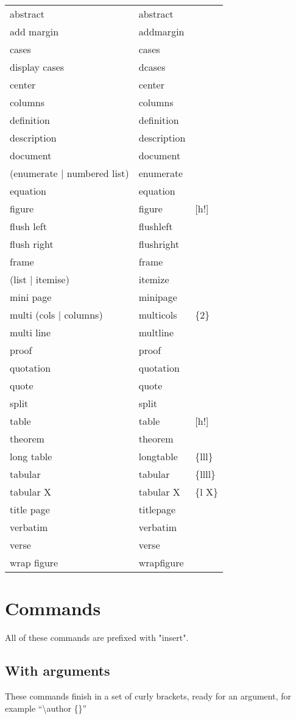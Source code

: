 \documentclass[12pt, a4paper]{article}
\begin{document}
\begin{longtable}{lll}
abstract & abstract & \\
add margin & addmargin & \\
cases & cases & \\
display cases & dcases \\
center & center & \\
columns & columns & \\
definition & definition & \\
description & description & \\
document & document & \\
(enumerate | numbered list) & enumerate & \\
equation & equation & \\
figure & figure & [h!] \\
flush left & flushleft & \\
flush right & flushright & \\
frame & frame & \\
(list | itemise) & itemize & \\
mini page & minipage & \\
multi (cols | columns) & multicols & \{2\} \\
multi line & multline & \\
proof & proof & \\
quotation & quotation & \\
quote & quote & \\
split & split & \\
table & table & [h!] \\
theorem & theorem & \\
long table & longtable & \{lll\} \\
tabular & tabular & \{llll\} \\
tabular X & tabular X & \{l X\} \\
title page & titlepage & \\
verbatim & verbatim & \\
verse & verse & \\
wrap figure & wrapfigure & \\
\end{longtable}

\section{Commands}
All of these commands are prefixed with "insert".

\subsection{With arguments}
These commands finish in a set of curly brackets, ready for an argument, for example ``\textbackslash author \{\}''
\end{document}
